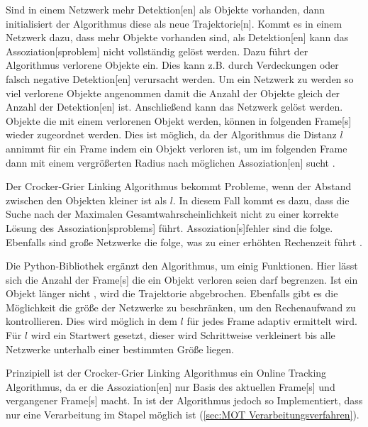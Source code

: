 Sind in einem Netzwerk mehr \gls{Detektion}[en] als Objekte vorhanden, dann initialisiert der Algorithmus diese als neue \gls{Trajektorie}[n]. Kommt es in einem Netzwerk dazu, dass mehr Objekte vorhanden sind, als \gls{Detektion}[en] kann das \gls{Assoziation}[sproblem] nicht vollständig gelöst werden. Dazu führt der Algorithmus verlorene Objekte ein. Dies kann z.B. durch Verdeckungen oder falsch negative \gls{Detektion}[en] verursacht werden. Um ein Netzwerk zu  werden so viel verlorene Objekte angenommen damit die Anzahl der Objekte gleich der Anzahl der \gls{Detektion}[en] ist. Anschließend kann das Netzwerk gelöst werden. Objekte die mit einem verlorenen Objekt  werden, können in folgenden \gls{Frame}[s] wieder zugeordnet werden. Dies ist möglich, da der Algorithmus die Distanz \(l\) annimmt für ein \gls{Frame} indem ein Objekt verloren ist, um im folgenden \gls{Frame} dann mit einem vergrößerten Radius nach möglichen \gls{Assoziation}[en] sucht \cite{Crocker.1996}. \par 

Der Crocker-Grier Linking Algorithmus bekommt Probleme, wenn der Abstand zwischen den Objekten kleiner ist als \(l\). In diesem Fall kommt es dazu, dass die Suche nach der Maximalen Gesamtwahrscheinlichkeit nicht zu einer korrekte Lösung des \gls{Assoziation}[sproblems] führt. \gls{Assoziation}[s]fehler sind die folge. Ebenfalls sind große Netzwerke die folge, was zu einer erhöhten Rechenzeit führt \cite{Crocker.1996}. \par

Die \gls{Python}-\gls{Bibliothek} \cite{Allan.2023} ergänzt den Algorithmus, um einig Funktionen. Hier lässt sich die Anzahl der \gls{Frame}[s] die ein Objekt verloren seien darf begrenzen. Ist ein Objekt länger nicht , wird die \gls{Trajektorie} abgebrochen. Ebenfalls gibt es die Möglichkeit die größe der Netzwerke zu beschränken, um den Rechenaufwand zu kontrollieren. Dies wird möglich in dem \(l\) für jedes \gls{Frame} adaptiv ermittelt wird. Für \(l\) wird ein Startwert gesetzt, dieser wird Schrittweise verkleinert bis alle Netzwerke unterhalb einer bestimmten Größe liegen. \par

Prinzipiell ist der Crocker-Grier Linking Algorithmus ein \gls{Online Tracking} Algorithmus, da er die \gls{Assoziation}[en] nur Basis des aktuellen \gls{Frame}[s] und vergangener \gls{Frame}[s] macht. In \cite{Allan.2023} ist der Algorithmus jedoch so Implementiert, dass nur eine Verarbeitung im Stapel möglich ist (\ref{sec:MOT Verarbeitungsverfahren}). 

